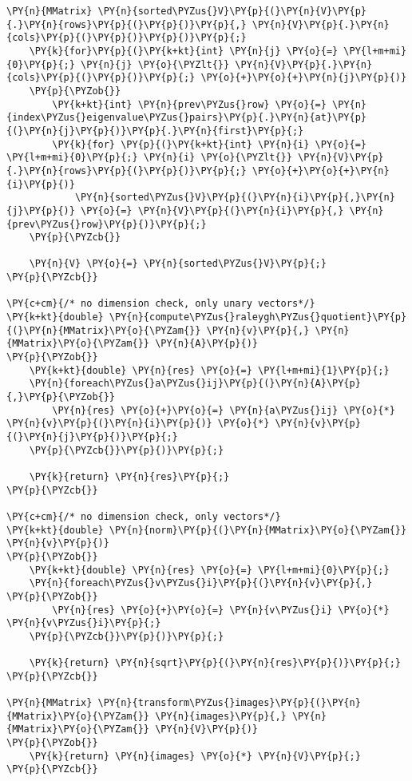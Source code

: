 \begin{Verbatim}[commandchars=\\\{\}]
	\PY{n}{MMatrix} \PY{n}{sorted\PYZus{}V}\PY{p}{(}\PY{n}{V}\PY{p}{.}\PY{n}{rows}\PY{p}{(}\PY{p}{)}\PY{p}{,} \PY{n}{V}\PY{p}{.}\PY{n}{cols}\PY{p}{(}\PY{p}{)}\PY{p}{)}\PY{p}{;}
	\PY{k}{for}\PY{p}{(}\PY{k+kt}{int} \PY{n}{j} \PY{o}{=} \PY{l+m+mi}{0}\PY{p}{;} \PY{n}{j} \PY{o}{\PYZlt{}} \PY{n}{V}\PY{p}{.}\PY{n}{cols}\PY{p}{(}\PY{p}{)}\PY{p}{;} \PY{o}{+}\PY{o}{+}\PY{n}{j}\PY{p}{)}
	\PY{p}{\PYZob{}}
		\PY{k+kt}{int} \PY{n}{prev\PYZus{}row} \PY{o}{=} \PY{n}{index\PYZus{}eigenvalue\PYZus{}pairs}\PY{p}{.}\PY{n}{at}\PY{p}{(}\PY{n}{j}\PY{p}{)}\PY{p}{.}\PY{n}{first}\PY{p}{;}
		\PY{k}{for} \PY{p}{(}\PY{k+kt}{int} \PY{n}{i} \PY{o}{=} \PY{l+m+mi}{0}\PY{p}{;} \PY{n}{i} \PY{o}{\PYZlt{}} \PY{n}{V}\PY{p}{.}\PY{n}{rows}\PY{p}{(}\PY{p}{)}\PY{p}{;} \PY{o}{+}\PY{o}{+}\PY{n}{i}\PY{p}{)}
			\PY{n}{sorted\PYZus{}V}\PY{p}{(}\PY{n}{i}\PY{p}{,}\PY{n}{j}\PY{p}{)} \PY{o}{=} \PY{n}{V}\PY{p}{(}\PY{n}{i}\PY{p}{,} \PY{n}{prev\PYZus{}row}\PY{p}{)}\PY{p}{;}
	\PY{p}{\PYZcb{}}

	\PY{n}{V} \PY{o}{=} \PY{n}{sorted\PYZus{}V}\PY{p}{;}
\PY{p}{\PYZcb{}}

\PY{c+cm}{/* no dimension check, only unary vectors*/}
\PY{k+kt}{double} \PY{n}{compute\PYZus{}raleygh\PYZus{}quotient}\PY{p}{(}\PY{n}{MMatrix}\PY{o}{\PYZam{}} \PY{n}{v}\PY{p}{,} \PY{n}{MMatrix}\PY{o}{\PYZam{}} \PY{n}{A}\PY{p}{)}
\PY{p}{\PYZob{}}
	\PY{k+kt}{double} \PY{n}{res} \PY{o}{=} \PY{l+m+mi}{1}\PY{p}{;}
	\PY{n}{foreach\PYZus{}a\PYZus{}ij}\PY{p}{(}\PY{n}{A}\PY{p}{,}\PY{p}{\PYZob{}}
		\PY{n}{res} \PY{o}{+}\PY{o}{=} \PY{n}{a\PYZus{}ij} \PY{o}{*} \PY{n}{v}\PY{p}{(}\PY{n}{i}\PY{p}{)} \PY{o}{*} \PY{n}{v}\PY{p}{(}\PY{n}{j}\PY{p}{)}\PY{p}{;}
	\PY{p}{\PYZcb{}}\PY{p}{)}\PY{p}{;}

	\PY{k}{return} \PY{n}{res}\PY{p}{;}
\PY{p}{\PYZcb{}}

\PY{c+cm}{/* no dimension check, only vectors*/}
\PY{k+kt}{double} \PY{n}{norm}\PY{p}{(}\PY{n}{MMatrix}\PY{o}{\PYZam{}} \PY{n}{v}\PY{p}{)}
\PY{p}{\PYZob{}}
	\PY{k+kt}{double} \PY{n}{res} \PY{o}{=} \PY{l+m+mi}{0}\PY{p}{;}
	\PY{n}{foreach\PYZus{}v\PYZus{}i}\PY{p}{(}\PY{n}{v}\PY{p}{,} \PY{p}{\PYZob{}}
		\PY{n}{res} \PY{o}{+}\PY{o}{=} \PY{n}{v\PYZus{}i} \PY{o}{*} \PY{n}{v\PYZus{}i}\PY{p}{;}
	\PY{p}{\PYZcb{}}\PY{p}{)}\PY{p}{;}

	\PY{k}{return} \PY{n}{sqrt}\PY{p}{(}\PY{n}{res}\PY{p}{)}\PY{p}{;}
\PY{p}{\PYZcb{}}

\PY{n}{MMatrix} \PY{n}{transform\PYZus{}images}\PY{p}{(}\PY{n}{MMatrix}\PY{o}{\PYZam{}} \PY{n}{images}\PY{p}{,} \PY{n}{MMatrix}\PY{o}{\PYZam{}} \PY{n}{V}\PY{p}{)}
\PY{p}{\PYZob{}}
	\PY{k}{return} \PY{n}{images} \PY{o}{*} \PY{n}{V}\PY{p}{;}
\PY{p}{\PYZcb{}}


\end{Verbatim}
